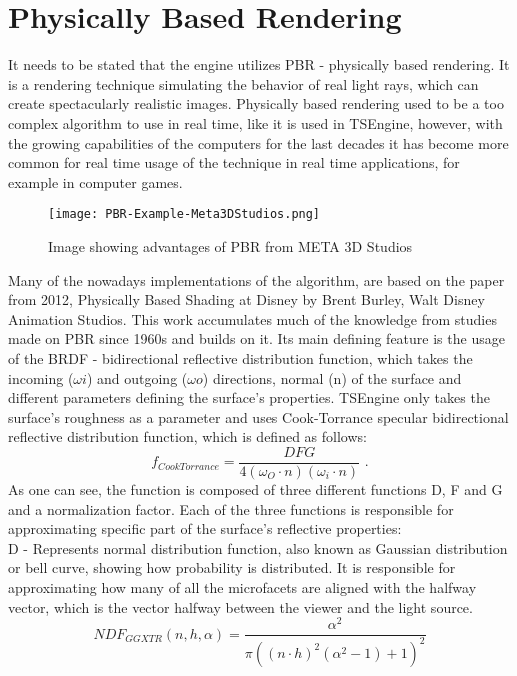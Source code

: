 \newpage
\section{Physically Based Rendering}
\label{sec:pbr}
It needs to be stated that the engine utilizes PBR - physically based rendering. It is a rendering technique simulating the behavior of real light rays, which can create spectacularly realistic images. Physically based rendering used to be a too complex algorithm to use in real time, like it is used in TSEngine, however, with the growing capabilities of the computers for the last decades it has become more common for real time usage of the technique in real time applications, for example in computer games.
\begin{figure}[H]
    \texttt{[image: PBR-Example-Meta3DStudios.png]}
    \caption{Image showing advantages of PBR from META 3D Studios \cite{pbrExample} }
\end{figure}
Many of the nowadays implementations of the algorithm, are based on the paper from 2012, Physically Based Shading at Disney by Brent Burley, Walt Disney Animation Studios. This work accumulates much of the knowledge from studies made on PBR since 1960s and builds on it. Its main defining feature is the usage of the BRDF - bidirectional reflective distribution function, which takes the incoming ($\omega i$) and outgoing ($\omega o$) directions, normal (n) of the surface and different parameters defining the surface's properties. TSEngine only takes the surface's roughness as a parameter and uses Cook-Torrance specular bidirectional reflective distribution function, which is defined as follows:
\begin{equation}
f_{CookTorrance}=\frac{DFG}{4(\omega_{O} \cdot n)(\omega_{i} \cdot n)}
\text{ .}
\label{EquationCookTorrance}
\end{equation}
As one can see, the function is composed of three different functions D, F and G and a normalization factor. Each of the three functions is responsible for approximating specific part of the surface's reflective properties:\\
D - Represents normal distribution function, also known as Gaussian distribution or bell curve, showing how probability is distributed. It is responsible for approximating how many of all the microfacets are aligned with the halfway vector, which is the vector halfway between the viewer and the light source. \\
\begin{equation}
NDF_{GGXTR}(n, h, \alpha) = \frac{\alpha^2}{\pi((n \cdot h)^2(\alpha^2 - 1) + 1)^2}
\end{equation}
